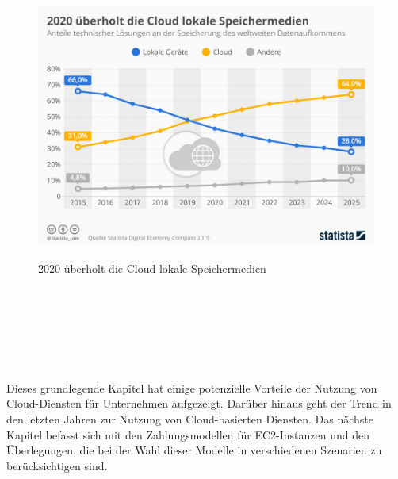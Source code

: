 \begin{figure}[h!]
      \centering
      \includegraphics[scale=0.4]{sources/moreCloudStorageThanLocal}
      \caption[2020 überholt die Cloud lokale Speichermedien]{}\label{fig:moreCloudStorageThanLocal}
      2020 überholt die Cloud lokale Speichermedien
            {\cite{STA1}}
\end{figure}
\\\\
\\\\
\\\\
Dieses grundlegende Kapitel hat einige potenzielle Vorteile der Nutzung von Cloud-Diensten für Unternehmen aufgezeigt. Darüber hinaus geht der Trend in den letzten Jahren zur Nutzung von Cloud-basierten Diensten. Das nächste Kapitel befasst sich mit den Zahlungsmodellen für EC2-Instanzen und den Überlegungen, die bei der Wahl dieser Modelle in verschiedenen Szenarien zu berücksichtigen sind.
\newpage


